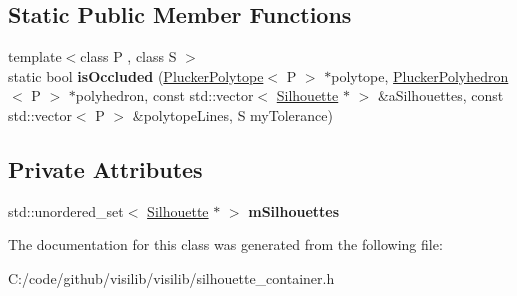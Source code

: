 \subsection*{Static Public Member Functions}
\begin{DoxyCompactItemize}
\item 
\mbox{\label{classvisilib_1_1_silhouette_container_a84194087a8fd4c5d1dfa04067efa3b72}} 
{\footnotesize template$<$class P , class S $>$ }\\static bool {\bfseries is\+Occluded} (\mbox{\hyperlink{classvisilib_1_1_plucker_polytope}{Plucker\+Polytope}}$<$ P $>$ $\ast$polytope, \mbox{\hyperlink{classvisilib_1_1_plucker_polyhedron}{Plucker\+Polyhedron}}$<$ P $>$ $\ast$polyhedron, const std\+::vector$<$ \mbox{\hyperlink{classvisilib_1_1_silhouette}{Silhouette}} $\ast$ $>$ \&a\+Silhouettes, const std\+::vector$<$ P $>$ \&polytope\+Lines, S my\+Tolerance)
\end{DoxyCompactItemize}
\subsection*{Private Attributes}
\begin{DoxyCompactItemize}
\item 
\mbox{\label{classvisilib_1_1_silhouette_container_a5a230bee3e0736d3c21080a632989d52}} 
std\+::unordered\+\_\+set$<$ \mbox{\hyperlink{classvisilib_1_1_silhouette}{Silhouette}} $\ast$ $>$ {\bfseries m\+Silhouettes}
\end{DoxyCompactItemize}


The documentation for this class was generated from the following file\+:\begin{DoxyCompactItemize}
\item 
C\+:/code/github/visilib/visilib/silhouette\+\_\+container.\+h\end{DoxyCompactItemize}
